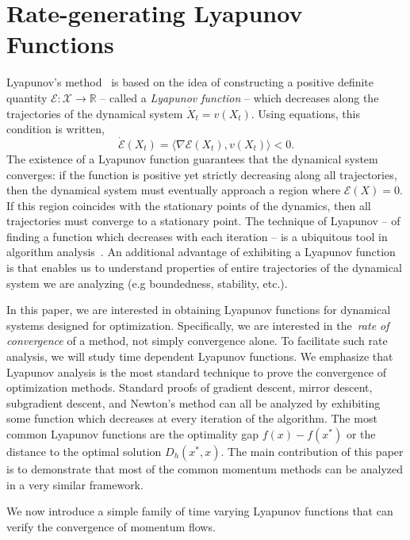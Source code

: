 \documentclass[11pt]{article}
\theoremstyle{plain}
\newcommand{\R}{{\mathbb R}}
\newcommand{\E}{{\mathcal E}}
\newcommand{\X}{{\mathcal X}}
\begin{document}
\section{Rate-generating Lyapunov Functions}
Lyapunov's method~\cite{Lyapunov} is based on the idea of constructing a positive definite quantity $\E: \X \rightarrow \R$ --  called a {\em Lyapunov function} -- which decreases along the trajectories of the dynamical system $\dot X_t = v(X_t)$. Using equations, this condition is written,
\begin{equation*}
\dot \E(X_t) =\langle \nabla \E(X_t), v(X_t)\rangle < 0.
\end{equation*}
The existence of a Lyapunov function guarantees that the dynamical system converges: if the function is positive yet strictly decreasing along all trajectories, then the dynamical system must eventually approach a region where $\E(X)=0$.  If this region coincides with the stationary points of the dynamics, then all trajectories must converge to a stationary point.  The technique of Lyapunov -- of finding a function which decreases with each iteration -- is a ubiquitous tool in algorithm analysis~\cite{CLR}.   An additional advantage of exhibiting a Lyapunov function is that enables us to understand properties of entire trajectories of the dynamical system we are analyzing (e.g boundedness, stability, etc.).  

In this paper, we are interested in obtaining Lyapunov functions for dynamical systems designed for optimization.  Specifically, we are  interested in the~\emph{rate of convergence} of a method, not simply convergence alone.  To facilitate such rate analysis, we will study time dependent Lyapunov functions.  We emphasize that Lyapunov analysis is the most standard technique to prove the convergence of optimization methods.   Standard proofs of gradient descent, mirror descent, subgradient descent, and Newton's method can all be analyzed by exhibiting some function which decreases at every iteration of the algorithm. The most common Lyapunov functions are the optimality gap $f(x)-f(x^\ast)$ or the distance to the optimal solution $D_h(x^\ast,x)$.  The main contribution of this paper is to demonstrate that most of the common momentum methods can be analyzed in a very similar framework.
 
 
 

We now introduce a simple family of time varying Lyapunov functions that can verify the convergence of momentum flows.
\end{document}
